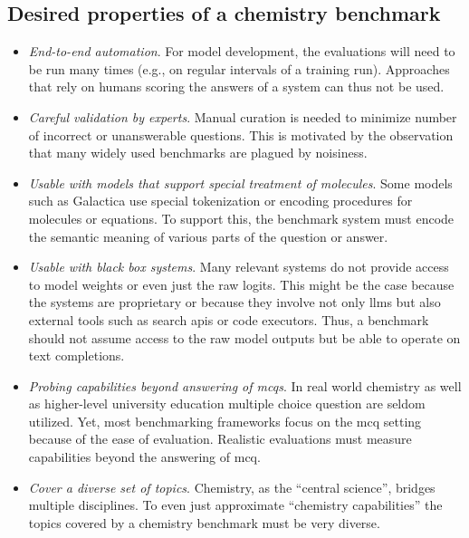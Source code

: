 
\subsection{Desired properties of a chemistry benchmark} \label{sec:desired-properties}

\begin{itemize}
    \item \emph{End-to-end automation}. For model development, the evaluations will need to be run many times (e.g., on regular intervals of a training run).
    Approaches that rely on humans scoring the answers of a system\cite{Schulze_Balhorn_2024, ai4science2023impact, castro2023large} can thus not be used.
    \item \emph{Careful validation by experts}. Manual curation is needed to minimize number of incorrect or unanswerable questions.\cite{northcutt2021pervasive}
    This is motivated by the observation that many widely used benchmarks are plagued by noisiness.\cite{Frye_2023, Awg}
    \item \emph{Usable with models that support special treatment of molecules}. Some models such as Galactica\cite{taylor2022galactica} use special tokenization or encoding procedures for molecules or equations.
    To support this, the benchmark system must encode the semantic meaning of various parts of the question or answer.
    \item \emph{Usable with black box systems}. Many relevant systems do not provide access to model weights or even just the raw logits.
    This might be the case because the systems are proprietary or because they involve not only \glspl{llm} but also external tools such as search \glspl{api} or code executors.\cite{schick2024toolformer, karpas2022mrkl, yao2022react}
    Thus, a benchmark should not assume access to the raw model outputs but be able to operate on text completions.
    \item \emph{Probing capabilities beyond answering of \glspl{mcq}}. In real world chemistry as well as higher-level university education multiple choice question are seldom utilized.
    Yet, most benchmarking frameworks focus on the \gls{mcq} setting because of the ease of evaluation. Realistic evaluations must measure capabilities beyond the answering of \gls{mcq}.
    \item \emph{Cover a diverse set of topics}. Chemistry, as the \enquote{central science}, bridges multiple disciplines.\cite{Aspuru_Guzik_2018} To even just approximate \enquote{chemistry capabilities} the topics covered by a chemistry benchmark must be very diverse.
\end{itemize}

